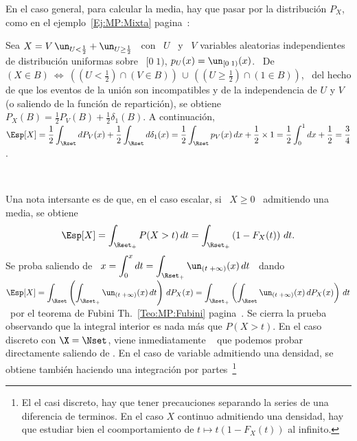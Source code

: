 En el caso general, para calcular  la media, hay que pasar por la distribuci\'on
$P_X$, como en el ejemplo~\ref{Ej:MP:Mixta}  pagina~\pageref{Ej:MP:Mixta}:
%
\begin{ejemplo}
\label{Ej:MP:EspMixta}
%
Sea $X =  V \, \un_{U <  \frac12} + \un_{U \ge \frac12}$  \ con \ $U$ \  y \ $V$
variables aleatorias  independientes de distribuci\'on uniformas sobre  \ $[0 \;
1)$, \ie  $p_U(x) = \un_{[0 \;  1)}(x)$. \ De \  $(X \in B)  \: \Leftrightarrow \:
\left( \left( U < \frac12 \right) \cap \left( V \in B \right) \right) \, \cup \,
\left( \left( U \ge \frac12 \right) \cap  \left( 1 \in B \right) \right)$, \ del
hecho de que  los eventos de la uni\'on son incompatibles  y de la independencia
de $U$ y $V$ (o saliendo de la funci\'on de repartici\'on), se obtiene $P_X(B) =
\frac12  P_V(B)  + \frac12  \delta_1(B)$.   A  continuaci\'on, \  $\displaystyle
\Esp[X] = \frac12 \int_\Rset dP_V(x) + \frac12 \int_\Rset d\delta_1(x) = \frac12
\int_\Rset p_V(x)  \, dx + \frac12  \times 1 =  \frac12 \int_0^1 dx +  \frac12 =
\frac34$.
\end{ejemplo}

\

Una nota intersante es  de que, en el caso escalar, si \  $X \ge 0$ \ admitiendo
una media, se obtiene
%
\[
\Esp[X]  = \int_{\Rset_+} P(X  > t)  \, dt  = \int_{\Rset_+}  \left( 1  - F_X(t)
\right) \, dt.
\]
%
Se proba saliendo  de \ $\displaystyle x = \int_0^x  dt = \int_{\Rset_+} \un_{(t
  \; +\infty)}(x)  \, dt$ \ dando  \ $\displaystyle \Esp[X]  = \int_\Rset \left(
  \int_{\Rset_+}   \un_{(t  \;  +\infty)}(x)   \,  dt   \right)  \,   dP_X(x)  =
\int_{\Rset_+} \left(  \int_\Rset \un_{(t \; +\infty)}(x) \,  dP_X(x) \right) \,
dt$     \     por    el     teorema     de    Fubini     Th.~\ref{Teo:MP:Fubini}
pagina~\pageref{Teo:MP:Fubini}. Se  cierra la prueba observando  que la integral
interior es nada  m\'as que $P(X > t)$.   En el caso discreto con  $\X = \Nset$,
viene inmediatamente \   que
podemos probar  directamente saliendo de  . En el  caso de variable admitiendo una  densidad, se  obtiene tambi\'en
haciendo  una integraci\'on por  partes~\footnote{El el  casi discreto,  hay que
  tener precauciones  separando la series de  una diferencia de  terminos. En el
  caso  $X$  continuo  admitiendo  una   densidad,  hay  que  estudiar  bien  el
  coomportamiento de $t \mapsto t (1-F_X(t))$ al infinito.}

